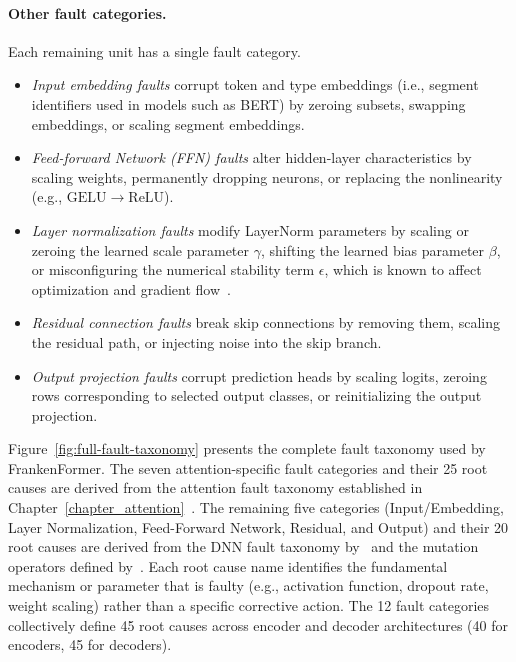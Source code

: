 \paragraph{Other fault categories.}
Each remaining unit has a single fault category.

\begin{itemize}
  \item \emph{Input embedding faults} corrupt token and type embeddings (i.e., segment identifiers used in models such as BERT) by zeroing subsets, swapping embeddings, or scaling segment embeddings.
  \item \emph{Feed-forward Network (FFN) faults} alter hidden-layer characteristics by scaling weights, permanently dropping neurons, or replacing the nonlinearity (e.g., $\mathrm{GELU} \rightarrow \mathrm{ReLU}$).
  \item \emph{Layer normalization faults} modify LayerNorm parameters by scaling or zeroing the learned scale parameter $\gamma$, shifting the learned bias parameter $\beta$, or misconfiguring the numerical stability term $\epsilon$, which is known to affect optimization and gradient flow~\citep{xiong2020layer,mosbach2021stability}.
  \item \emph{Residual connection faults} break skip connections by removing them, scaling the residual path, or injecting noise into the skip branch.
  \item \emph{Output projection faults} corrupt prediction heads by scaling logits, zeroing rows corresponding to selected output classes, or reinitializing the output projection.
\end{itemize}

Figure~\ref{fig:full-fault-taxonomy} presents the complete fault taxonomy used by FrankenFormer. The seven attention-specific fault categories and their 25 root causes are derived from the attention fault taxonomy established in Chapter~\ref{chapter_attention}~\cite{attention_taxonomy}. The remaining five categories (Input/Embedding, Layer Normalization, Feed-Forward Network, Residual, and Output) and their 20 root causes are derived from the DNN fault taxonomy by~\citet{faulttaxonomy} and the mutation operators defined by~\citet{deepcrime}. Each root cause name identifies the fundamental mechanism or parameter that is faulty (e.g., activation function, dropout rate, weight scaling) rather than a specific corrective action. The 12 fault categories collectively define 45 root causes across encoder and decoder architectures (40 for encoders, 45 for decoders).

